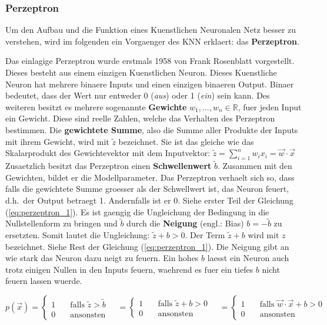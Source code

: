 \documentclass[../main]{subfiles}
\begin{document}
\subsubsection{Perzeptron}
Um den Aufbau und die Funktion eines Kuenstlichen Neuronalen Netz besser zu
verstehen, wird im folgenden ein Vorgaenger des KNN erklaert: das \textbf{Perzeptron}.
\par\medskip
Das einlagige Perzeptron wurde erstmals 1958 von Frank Rosenblatt vorgestellt. Dieses
besteht aus einem einzigen Kuenstlichen Neuron. Dieses Kuenstliche Neuron
hat mehrere binaere Inputs und einen einzigen binaeren Output. Binaer
bedeutet, dass der Wert nur entweder 0 (\textit{aus}) oder 1 (\textit{ein}) sein
kann. Des weiteren besitzt es mehrere sogenannte \textbf{Gewichte} $w_1, \ldots,
w_n \in \mathbb{R}$, fuer jeden Input ein Gewicht.
Diese sind reelle Zahlen, welche das Verhalten des Perzeptron bestimmen.
Die \textbf{gewichtete Summe}, also die Summe aller Produkte der Inputs mit
ihrem Gewicht, wird mit $\tilde{z}$ bezeichnet.
Sie ist das gleiche wie das Skalarprodukt des Gewichtevektor mit dem Inputvektor:
$\displaystyle \tilde{z} = \sum_{i=1}^{n} w_i x_i = \vec{w} \cdot \vec{x}$\\
Zusaetzlich besitzt das Perzeptron einen \textbf{Schwellenwert} $\tilde{b}$.
Zusammen mit den Gewichten, bildet er die Modellparameter.
Das Perzeptron verhaelt sich so, dass falls die gewichtete Summe groesser als der
Schwellwert ist, das Neuron feuert, d.h.\ der Output betraegt 1. Andernfalls ist er 0.
Siehe erster Teil der Gleichung (\ref{eq:perzeptron_1}).
Es ist gaengig die Ungleichung der Bedingung in die Nullstellenform zu bringen
und $\tilde{b}$ durch die \textbf{Neigung} (engl.: Bias)
$b = -\tilde{b}$ zu ersetzten. Somit lautet die Ungleichung: $\tilde{z} + b
> 0$. Der Term $\tilde{z} + b$ wird mit $z$ bezeichnet. Siehe Rest der Gleichung (\ref{eq:perzeptron_1}).
Die Neigung gibt an wie stark das Neuron dazu neigt zu feuern. Ein hohes $b$
laesst ein Neuron auch trotz einigen Nullen in den Inputs feuern, waehrend es
fuer ein tiefes $b$ nicht feuern lassen wuerde.

\begin{equation}\label{eq:perzeptron_1}
  p(\vec{x}) =
  \begin{cases}
    1 & \quad \text{falls } \tilde{z} > \tilde{b}\\
    0 & \quad \text{ansonsten}
  \end{cases}
  \quad =
  \begin{cases}
    1 & \quad \text{falls } \tilde{z} + b > 0\\
    0 & \quad \text{ansonsten}
  \end{cases}
  \quad =
  \begin{cases}
    1 & \quad\text{falls } \vec{w} \cdot \vec{x} + b > 0\\
    0 & \quad\text{ansonsten}
  \end{cases}
\end{equation}
\end{document}
